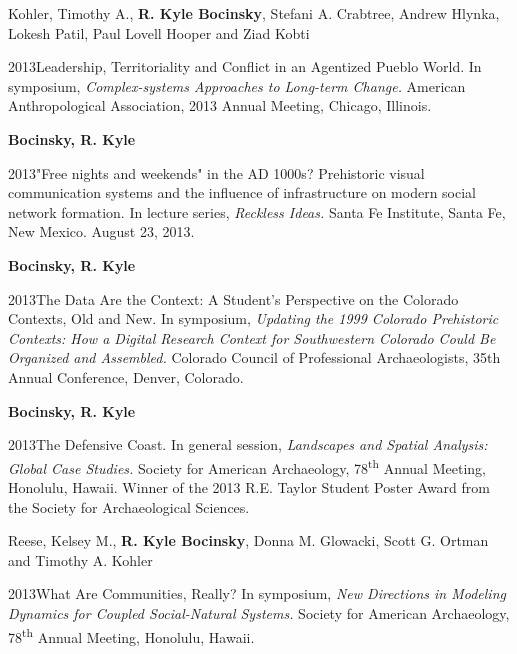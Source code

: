 Kohler, Timothy A., {\bf R. Kyle Bocinsky}, Stefani A. Crabtree, Andrew Hlynka, Lokesh Patil, Paul Lovell Hooper and Ziad Kobti
\nopagebreak
\begin{list1}
\item[] 2013\hspace{.2cm}Leadership, Territoriality and Conflict in an Agentized Pueblo World. In symposium, \emph{Complex-systems Approaches to Long-term Change.} American Anthropological Association, 2013 Annual Meeting, Chicago, Illinois.
\end{list1}


{\bf Bocinsky, R. Kyle}
\nopagebreak
\begin{list1}
\item[] 2013\hspace{.2cm}"Free nights and weekends" in the AD 1000s? 
Prehistoric visual communication systems and the influence of infrastructure on modern social network formation. In lecture series, \emph{Reckless Ideas.} Santa Fe Institute, Santa Fe, New Mexico. August 23, 2013.
\end{list1}


{\bf Bocinsky, R. Kyle}
\nopagebreak
\begin{list1}
\item[] 2013\hspace{.2cm}The Data Are the Context: A Student's Perspective on the Colorado Contexts, Old and New. In symposium, \emph{Updating the 1999 Colorado Prehistoric Contexts: How a Digital Research Context for Southwestern Colorado Could Be Organized and Assembled.} Colorado Council of Professional Archaeologists, 35th Annual Conference, Denver, Colorado.
\end{list1}


{\bf Bocinsky, R. Kyle}
\nopagebreak
\begin{list1}
\item[] 2013\hspace{.2cm}The Defensive Coast. In general session, \emph{Landscapes and Spatial Analysis: Global Case Studies.} Society for American Archaeology, 78\textsuperscript{th} Annual Meeting, Honolulu, Hawaii. Winner of the 2013 R.E. Taylor Student Poster Award from the Society for Archaeological Sciences. %
\end{list1}


Reese, Kelsey M., {\bf R. Kyle Bocinsky}, Donna M. Glowacki, Scott G. Ortman and Timothy A. Kohler
\nopagebreak
\begin{list1}
\item[] 2013\hspace{.2cm}What Are Communities, Really? In symposium, \emph{New Directions in Modeling Dynamics for Coupled Social-Natural Systems.} Society for American Archaeology, 78\textsuperscript{th} Annual Meeting, Honolulu, Hawaii.
\end{list1}


